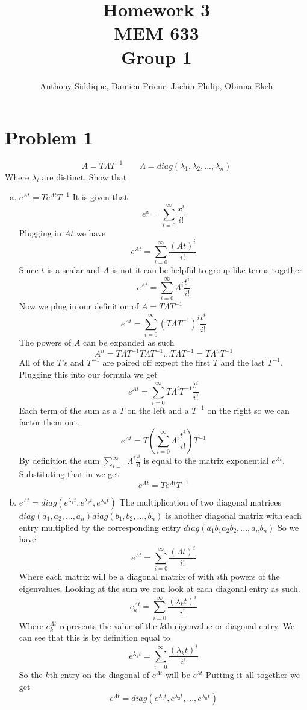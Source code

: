 \documentclass{article}
\author{Anthony Siddique, Damien Prieur, Jachin Philip, Obinna Ekeh}
\title{Homework 3\\ MEM 633 \\ Group 1}
\date{}
\begin{document}
\maketitle

\section*{Problem 1}
$$ A = T \Lambda T^{-1} \qquad \Lambda = diag(\lambda_1,\lambda_2, ..., \lambda_n) $$
Where $\lambda_i$ are distinct.
Show that
\begin{enumerate}[(a)]
\item $e^{At} = Te^{\Lambda t}T^{-1}$
\newline
It is given that
$$ e^x = \sum_{i=0}^\infty \frac{x^i}{i!} $$
Plugging in $At$ we have
$$ e^{At} = \sum_{i=0}^\infty \frac{(At)^i}{i!} $$
Since $t$ is a scalar and $A$ is not it can be helpful to group like terms together
$$ e^{At} = \sum_{i=0}^\infty A^i\frac{t^i}{i!} $$
Now we plug in our definition of $A = T \Lambda T^{-1} $
$$ e^{At} = \sum_{i=0}^\infty (T \Lambda T^{-1})^i\frac{t^i}{i!} $$
The powers of $A$ can be expanded as such
$$ A^n = T\Lambda T^{-1} T\Lambda T^{-1}...T\Lambda T^{-1} = T\Lambda^n T^{-1} $$
All of the $T$'s and $T^{-1}$ are paired off expect the first $T$ and the last $T^{-1}$.
Plugging this into our formula we get
$$ e^{At} = \sum_{i=0}^\infty T \Lambda^i T^{-1}\frac{t^i}{i!} $$
Each term of the sum as a $T$ on the left and a $T^{-1}$ on the right so we can factor them out.
$$ e^{At} = T(\sum_{i=0}^\infty \Lambda^i \frac{t^i}{i!})T^{-1} $$
By definition the sum $\sum_{i=0}^\infty \Lambda^i \frac{t^i}{i!}$ is equal to the matrix exponential $e^{\Lambda t}$.
Substituting that in we get
$$ e^{At} = Te^{\Lambda t}T^{-1} $$



\item $e^{\Lambda t} = diag (e^{\lambda_1 t}, e^{\lambda_2 t}, e^{\lambda_n t})$
\newline
The multiplication of two diagonal matrices  $diag(a_1, a_2, ..., a_n) diag(b_1, b_2, ..., b_n)$ is another diagonal matrix with each entry multiplied by the corresponding entry $ diag(a_1b_1 a_2b_2, ..., a_nb_n)$
So we have
$$ e^{\Lambda t} = \sum_{i=0}^\infty \frac{(\Lambda t) ^i}{i!} $$
Where each matrix will be a diagonal matrix of with $i$th powers of the eigenvalues.
Looking at the sum we can look at each diagonal entry as such.
$$ e^{\Lambda t}_k = \sum_{i=0}^\infty \frac{(\lambda_k t) ^i}{i!} $$
Where $e^{\Lambda t}_k$ represents the value of the $k$th eigenvalue or diagonal entry.
We can see that this is by definition equal to
$$ e^{\lambda_k t} = \sum_{i=0}^\infty \frac{(\lambda_k t) ^i}{i!} $$
So the $k$th entry on the diagonal of $e^{\Lambda t}$ will be $e^{\lambda t}$
Putting it all together we get
$$ e^{\Lambda t} = diag(e^{\lambda_1 t}, e^{\lambda_2 t}, ... , e^{\lambda_n t})$$

\end{enumerate}
\end{document}

